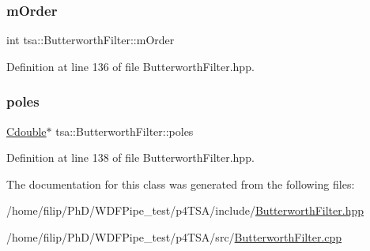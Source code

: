 \subsubsection{\texorpdfstring{m\+Order}{mOrder}}
{\footnotesize\ttfamily int tsa\+::\+Butterworth\+Filter\+::m\+Order\hspace{0.3cm}{\ttfamily [private]}}



Definition at line 136 of file Butterworth\+Filter.\+hpp.

\mbox{\label{classtsa_1_1_butterworth_filter_a35cbb21e7a98ac4214147afd1aa5b1fe}} 
\subsubsection{\texorpdfstring{poles}{poles}}
{\footnotesize\ttfamily \hyperlink{namespacetsa_a7b1f40fa90474b78dd0ab472b7c37547}{Cdouble}$\ast$ tsa\+::\+Butterworth\+Filter\+::poles\hspace{0.3cm}{\ttfamily [private]}}



Definition at line 138 of file Butterworth\+Filter.\+hpp.



The documentation for this class was generated from the following files\+:\begin{DoxyCompactItemize}
\item 
/home/filip/\+Ph\+D/\+W\+D\+F\+Pipe\+\_\+test/p4\+T\+S\+A/include/\hyperlink{_butterworth_filter_8hpp}{Butterworth\+Filter.\+hpp}\item 
/home/filip/\+Ph\+D/\+W\+D\+F\+Pipe\+\_\+test/p4\+T\+S\+A/src/\hyperlink{_butterworth_filter_8cpp}{Butterworth\+Filter.\+cpp}\end{DoxyCompactItemize}
